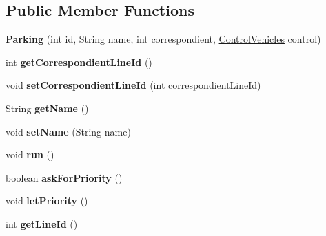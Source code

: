 \subsection*{Public Member Functions}
\begin{DoxyCompactItemize}
\item 
\mbox{\label{classmondragon_1_1edu_1_1clases_1_1_parking_a62d5e858a5c03d1b708d2011fb40c995}} 
{\bfseries Parking} (int id, String name, int correspondient, \mbox{\hyperlink{classmondragon_1_1edu_1_1control_1_1_control_vehicles}{Control\+Vehicles}} control)
\item 
\mbox{\label{classmondragon_1_1edu_1_1clases_1_1_parking_a5838e9db2c60429951776565db0959d0}} 
int {\bfseries get\+Correspondient\+Line\+Id} ()
\item 
\mbox{\label{classmondragon_1_1edu_1_1clases_1_1_parking_a6e6f9f0e719a08e56590c27c1c7df211}} 
void {\bfseries set\+Correspondient\+Line\+Id} (int correspondient\+Line\+Id)
\item 
\mbox{\label{classmondragon_1_1edu_1_1clases_1_1_parking_ad9066181322b2bee2c55f2836df35af9}} 
String {\bfseries get\+Name} ()
\item 
\mbox{\label{classmondragon_1_1edu_1_1clases_1_1_parking_a126cd13630da08271f6fd574d0d2bc38}} 
void {\bfseries set\+Name} (String name)
\item 
\mbox{\label{classmondragon_1_1edu_1_1clases_1_1_parking_a14039bfd191e0b32d3e540bf78db1846}} 
void {\bfseries run} ()
\item 
\mbox{\label{classmondragon_1_1edu_1_1clases_1_1_parking_a7a3475d6f9ca22af6eef193ae5820caf}} 
boolean {\bfseries ask\+For\+Priority} ()
\item 
\mbox{\label{classmondragon_1_1edu_1_1clases_1_1_parking_a01ee01088d6b8b4172df5a81607d6f66}} 
void {\bfseries let\+Priority} ()
\item 
\mbox{\label{classmondragon_1_1edu_1_1clases_1_1_parking_a4939984d65bef68ce75107986339f511}} 
int {\bfseries get\+Line\+Id} ()
\end{DoxyCompactItemize}
